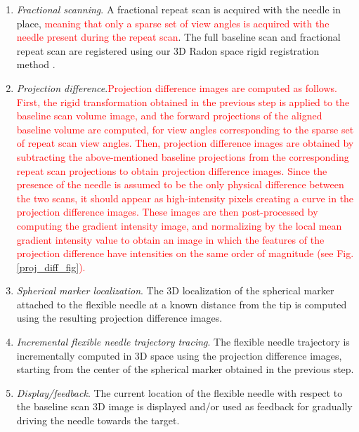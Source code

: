 \begin{enumerate}
\item \textit{Fractional scanning}. A fractional repeat scan is acquired with the needle in place, \textcolor{red}{meaning that only a sparse set of view angles is acquired with the needle present during the repeat scan}. The full baseline scan and fractional repeat scan are registered using our 3D Radon space rigid registration method \cite{medan2017sparse}. \\[0.05ex]
\item \textit{Projection difference}.\textcolor{red}{Projection difference images are computed as follows. First, the rigid transformation obtained in the previous step is applied to the baseline scan volume image, and the forward projections of the aligned baseline volume are computed, for view angles corresponding to the sparse set of repeat scan view angles. Then, projection difference images are obtained by subtracting the above-mentioned baseline projections from the corresponding repeat scan projections to obtain projection difference images. Since the presence of the needle is assumed to be the only physical difference between the two scans, it should appear as high-intensity pixels creating a curve in the projection difference images. These images are then post-processed by computing the gradient intensity image, and normalizing by the local mean gradient intensity value to obtain an image in which the features of the projection difference have intensities on the same order of magnitude (see Fig. \ref{proj_diff_fig}).} \\[0.05ex]
\item \textit{Spherical marker localization}. The 3D localization of the spherical marker attached to the flexible needle at a known distance from the tip is computed using the resulting projection difference images.\\[0.1ex]
\item \textit{Incremental flexible needle trajectory tracing}. The flexible needle trajectory is incrementally computed in 3D space using the projection difference images, starting from the center of the spherical marker obtained in the previous step. \\[0.05ex]
\item \textit{Display/feedback}. The current location of the flexible needle with respect to the baseline scan 3D image is displayed and/or used as feedback for gradually driving the needle towards the target.
\end{enumerate}
